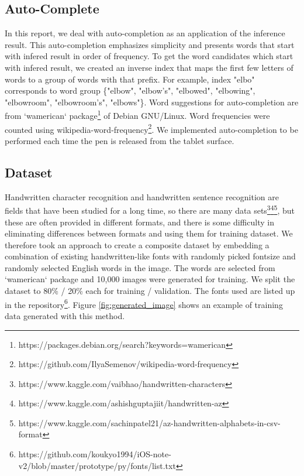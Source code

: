 \subsection{Auto-Complete}

In this report, we deal with auto-completion as an application of the inference result.
This auto-completion emphasizes simplicity and presents words
that start with infered result in order of frequency. To get the word candidates
which start with infered result, we created an inverse index
that maps the first few letters of words to a group of words with that prefix.
For example, index "elbo" corresponds to word group \{"elbow", "elbow's", "elbowed", "elbowing", "elbowroom", "elbowroom's", "elbows"\}.
Word suggestions for auto-completion are from `wamerican` package\footnote{https://packages.debian.org/search?keywords=wamerican} of Debian GNU/Linux.
Word frequencies were counted using wikipedia-word-frequency\footnote{https://github.com/IlyaSemenov/wikipedia-word-frequency}.
We implemented auto-completion to be performed each time the pen is released from the tablet surface.

\subsection{Dataset}

Handwritten character recognition and handwritten sentence recognition are
fields that have been studied for a long time, so there are many data sets\footnote{https://www.kaggle.com/vaibhao/handwritten-characters}\footnote{https://www.kaggle.com/ashishguptajiit/handwritten-az}\footnote{https://www.kaggle.com/sachinpatel21/az-handwritten-alphabets-in-csv-format}\cite{Dua:2019},
but these are often provided in different formats, and there is some difficulty
in eliminating differences between formats and using them for training dataset.
We therefore took an approach to create a composite dataset by
embedding a combination of existing handwritten-like fonts with randomly picked fontsize and
randomly selected English words in the image. The words are selected from `wamerican` package
and 10,000 images were generated for training. We split the dataset to 80\% / 20\% each for training / validation.
The fonts used are listed up in the repository\footnote{https://github.com/koukyo1994/iOS-note-v2/blob/master/prototype/py/fonts/list.txt}.
Figure \ref{fig:generated_image} shows an example of training data generated with this method.

